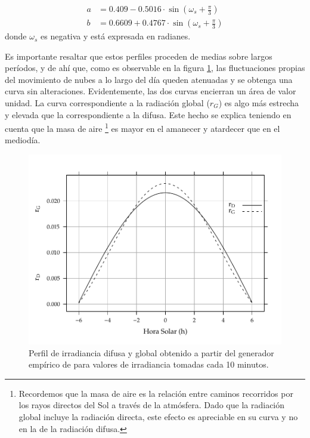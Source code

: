 \begin{align}
a & =0.409-0.5016\cdot\sin(\omega_{s}+\frac{\pi}{3})\\
b & =0.6609+0.4767\cdot\sin(\omega_{s}+\frac{\pi}{3})
\end{align}
donde $\omega_s$ es negativa y está expresada en radianes.

Es importante resaltar que estos perfiles proceden de medias sobre
largos períodos, y de ahí que, como es observable en la figura \ref{fig:Perfil-de-irradiancia},
las fluctuaciones propias del movimiento de nubes a lo largo del día
queden atenuadas y se obtenga una curva sin alteraciones. Evidentemente,
las dos curvas encierran un área de valor unidad. La curva correspondiente
a la radiación global ($r_{G}$) es algo más estrecha y elevada que
la correspondiente a la difusa. Este hecho se explica teniendo en
cuenta que la masa de aire%
\footnote{Recordemos que la masa de aire es la relación entre caminos recorridos
por los rayos directos del Sol a través de la atmósfera. Dado que
la radiación global incluye la radiación directa, este efecto es apreciable
en su curva y no en la de la radiación difusa.%
} es mayor en el amanecer y atardecer que en el mediodía.


\begin{figure}
\begin{centering}
\includegraphics[scale=0.75]{../figs/RgRd}
\end{centering}

\caption{Perfil de irradiancia difusa y global obtenido a partir del generador
empírico de \cite{Collares-Pereira.Rabl1979} para valores de irradiancia
tomadas cada 10 minutos.\label{fig:Perfil-de-irradiancia} }

\end{figure}



